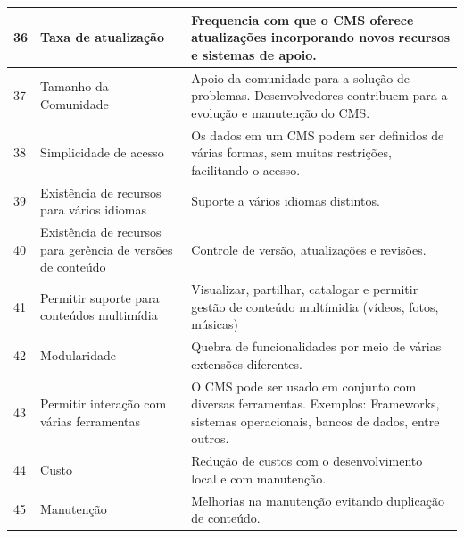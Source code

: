 \begin{apendicesenv}
\begin{landscape}
\begin{longtable}{|p{10pt}|p{220pt}|p{415pt}|}
 	 {\raggedright {36}}
 	  	 	 	 	 & {\raggedright {Taxa de atualização}}
 	  	 	 	 	 & {\raggedright {Frequencia com que o CMS oferece atualizações incorporando novos recursos e sistemas de apoio. \cite{Iliev2013} }}\\
 	  	 	 	 	\hline
 	 {\raggedright {37}}
 	  	 	 	 	 & {\raggedright {Tamanho da Comunidade}}
 	  	 	 	 	 & {\raggedright {Apoio da comunidade para a solução de problemas. Desenvolvedores contribuem para a evolução e manutenção do CMS.  \cite{Cheng2012} }}\\
 	  	 	 	 	\hline
 	 {\raggedright {38}}
 	  	 	 	 	 & {\raggedright {Simplicidade de acesso}}
 	  	 	 	 	 & {\raggedright {Os dados em um CMS podem ser definidos de várias formas, sem muitas restrições, facilitando o acesso. \cite{Ennert2012}}}\\
 	  	 	 	 	\hline
 	  	 	 	 	{\raggedright {39}}
 	  	 	 	 	 & {\raggedright {Existência de recursos para vários idiomas}}
 	  	 	 	 	 	 	 	 	 & {\raggedright {Suporte a vários idiomas distintos. \cite{Ennert2012}}}\\
 	  	 	 	 	 	 	 	 	\hline 
 	 {\raggedright {40}}
 	  	 	 	 	 & {\raggedright Existência de recursos para gerência de versões de conteúdo}
 	  	 	 	 	 & {\raggedright {Controle de versão, atualizações e revisões. \cite{Ennert2012}}}\\
 	  	 	 	 	\hline
{\raggedright {41}}
 	 	 & {\raggedright {Permitir suporte para conteúdos multimídia}}
 	 	 & {\raggedright {Visualizar, partilhar, catalogar e permitir gestão de conteúdo multímidia (vídeos, fotos, músicas)}\cite{Ennert2012}}\\
 	 	\hline
 	{\raggedright {42}}
 	 	 & {\raggedright {Modularidade}}
 	 	 & {\raggedright {Quebra de funcionalidades por meio de várias extensões diferentes. \cite{Iliev2013} }}\\
 	 	\hline
 	{\raggedright {43}}
 	 	 & {\raggedright {Permitir  interação com várias ferramentas}}
 	 	 & {\raggedright {O CMS pode ser usado em conjunto com diversas ferramentas. Exemplos: Frameworks, sistemas operacionais, bancos de dados, entre outros. \cite{Nurminen2008}}}\\
 	 	\hline
 	 	{\raggedright {44}}
 	 	 	 	 & {\raggedright {Custo}}
 	 	 	 	 & {\raggedright {Redução de custos com o desenvolvimento local e com manutenção. \cite{Iliev2013}}}\\
 	 	 	 	\hline
 	 {\raggedright {45}}
 	  	 	 	 	 & {\raggedright {Manutenção}}
 	  	 	 	 	 & {\raggedright {Melhorias na manutenção evitando duplicação de conteúdo. \cite{Iliev2013}}}\\
 	  	 	 	 	\hline
 	  	 	 	 	

\end{longtable}
\end{landscape}
\end{apendicesenv}
